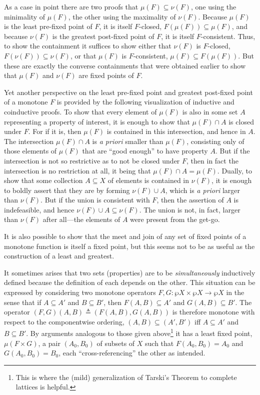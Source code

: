 \documentclass[11pt,twoside]{article}
\newcommand{\eqdef}{\mathrel{\triangleq}}
\begin{document}
As a case in point there are two proofs that $\mu(F)\subseteq\nu(F)$, one using the minimality of
$\mu(F)$, the other using the maximality of $\nu(F)$.  Because $\mu(F)$ is the least pre-fixed
point of $F$, it is itself $F$-closed, $F(\mu(F))\subseteq\mu(F)$, and because $\nu(F)$ is the greatest
post-fixed point of $F$, it is itself $F$-consistent.  Thus, to show the containment it
suffices to show either that $\nu(F)$ is $F$-closed, $F(\nu(F))\subseteq\nu(F)$, or that
$\mu(F)$ is $F$-consistent, $\mu(F)\subseteq F(\mu(F))$.  But these are exactly the converse
containments that were obtained earlier to show that $\mu(F)$ and $\nu(F)$ are fixed points of
$F$.

\smallskip

Yet another perspective on the least pre-fixed point and greatest post-fixed point of a
monotone $F$ is provided by the following visualization of inductive and coinductive
proofs.  To show that every element of $\mu(F)$ is also in some set $A$ representing a
property of interest, it is enough to show that $\mu(F)\cap A$ is closed under $F$.  For if it
is, then $\mu(F)$ is contained in this intersection, and hence in $A$.  The intersection
$\mu(F)\cap A$ is \emph{a priori} smaller than $\mu(F)$, consisting only of those elements of
$\mu(F)$ that are ``good enough'' to have property $A$.  But if the intersection is not so
restrictive as to not be closed under $F$, then in fact the intersection is no restriction
at all, it being that $\mu(F)\cap A=\mu(F)$.  Dually, to show that some collection
$A\subseteq X$ of elements is contained in $\nu(F)$, it is enough to boldly assert that they are by
forming $\nu(F)\cup A$, which is \emph{a priori} larger than $\nu(F)$.  But if the union is
consistent with $F$, then the assertion of $A$ is indefeasible, and hence
$\nu(F)\cup A\subseteq\nu(F)$.  The union is not, in fact, larger than $\nu(F)$ after all---the elements of
$A$ were present from the get-go.

\smallskip

It is also possible to show that the meet and join of any set of fixed points of a
monotone function is itself a fixed point, but this seems not to be as useful as the
construction of a least and greatest.

\smallskip

It sometimes arises that two sets (properties) are to be \emph{simultaneously} inductively
defined because the definition of each depends on the other.  This situation can be
expressed by considering two monotone operators $F, G : \wp{X}\times\wp{X}\to\wp{X}$ in the sense that
if $A\subseteq A'$ and $B\subseteq B'$, then $F(A,B)\subseteq A'$ and
$G(A,B)\subseteq B'$.  The operator $(F,G)(A,B)\eqdef (F(A,B),G(A,B))$ is therefore monotone with
respect to the componentwise ordering, $(A,B)\subseteq (A',B')$ iff $A\subseteq A'$ and
$B\subseteq B'$.  By arguments analogous to those given above\footnote{This is where the (mild)
  generalization of Tarski's Theorem to complete lattices is helpful.} it has a least
fixed point, $\mu(F\times G)$, a pair $(A_{0},B_{0})$ of subsets of $X$ such that
$F(A_{0},B_{0})=A_{0}$ and $G(A_{0},B_{0})=B_{0}$, each ``cross-referencing'' the other as
intended.
\end{document}
